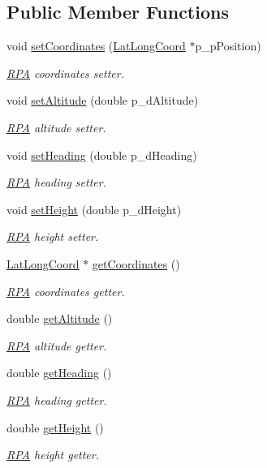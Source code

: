 \subsection*{Public Member Functions}
\begin{DoxyCompactItemize}
\item 
void \hyperlink{class_r_p_a_a73e2a1ed2687a4bdc9f2c26c28fd563f}{set\-Coordinates} (\hyperlink{class_lat_long_coord}{Lat\-Long\-Coord} $\ast$p\-\_\-p\-Position)
\begin{DoxyCompactList}\small\item\em \hyperlink{class_r_p_a}{R\-P\-A} coordinates setter. \end{DoxyCompactList}\item 
void \hyperlink{class_r_p_a_af91f33731ba1d1680317ca99bda7c711}{set\-Altitude} (double p\-\_\-d\-Altitude)
\begin{DoxyCompactList}\small\item\em \hyperlink{class_r_p_a}{R\-P\-A} altitude setter. \end{DoxyCompactList}\item 
void \hyperlink{class_r_p_a_a210a83272cf8f085e3a31452dcb91568}{set\-Heading} (double p\-\_\-d\-Heading)
\begin{DoxyCompactList}\small\item\em \hyperlink{class_r_p_a}{R\-P\-A} heading setter. \end{DoxyCompactList}\item 
void \hyperlink{class_r_p_a_ac5fb84fe41f689c1c01c1522759bdb03}{set\-Height} (double p\-\_\-d\-Height)
\begin{DoxyCompactList}\small\item\em \hyperlink{class_r_p_a}{R\-P\-A} height setter. \end{DoxyCompactList}\item 
\hyperlink{class_lat_long_coord}{Lat\-Long\-Coord} $\ast$ \hyperlink{class_r_p_a_a27cefa578f7c92816e85fc9d6998495f}{get\-Coordinates} ()
\begin{DoxyCompactList}\small\item\em \hyperlink{class_r_p_a}{R\-P\-A} coordinates getter. \end{DoxyCompactList}\item 
double \hyperlink{class_r_p_a_abbd8a7a66d01ad6d10e287820f6ed678}{get\-Altitude} ()
\begin{DoxyCompactList}\small\item\em \hyperlink{class_r_p_a}{R\-P\-A} altitude getter. \end{DoxyCompactList}\item 
double \hyperlink{class_r_p_a_ab04250ffa920db89d8fb3836e90e17a0}{get\-Heading} ()
\begin{DoxyCompactList}\small\item\em \hyperlink{class_r_p_a}{R\-P\-A} heading getter. \end{DoxyCompactList}\item 
double \hyperlink{class_r_p_a_a4d3e56dd3b88f9965843d7e16307f03e}{get\-Height} ()
\begin{DoxyCompactList}\small\item\em \hyperlink{class_r_p_a}{R\-P\-A} height getter. \end{DoxyCompactList}\end{DoxyCompactItemize}

